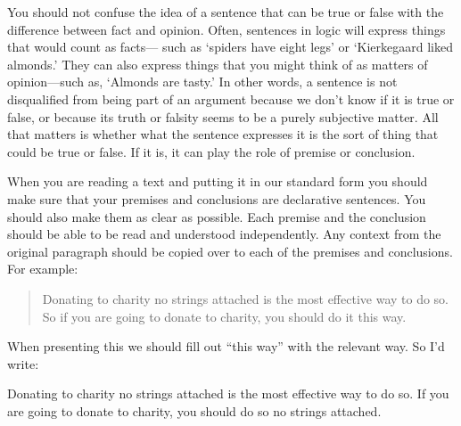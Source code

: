 You should not confuse the idea of a sentence that can be true or false with the difference between fact and opinion. Often, sentences in logic will express things that would count as facts--- such as `spiders have eight legs' or `Kierkegaard liked almonds.' They can also express things that you might think of as matters of opinion---such as, `Almonds are tasty.' In other words, a sentence is not disqualified from being part of an argument because we don't know if it is true or false, or because its truth or falsity seems to be a purely subjective matter. All that matters is whether what the sentence expresses it is the sort of thing that could be true or false. If it is, it can play the role of premise or conclusion.

When you are reading a text and putting it in our standard form you should make sure that your premises and conclusions are declarative sentences.
You should also make them as clear as possible. Each premise and the conclusion should be able to be read and understood independently. Any context from the original paragraph should be copied over to each of the premises and conclusions.
For example:
\begin{quote}
Donating to charity no strings attached is the most effective way to do so. So if you are going to donate to charity, you should do it this way.
\end{quote}
When presenting this we should fill out ``this way'' with the relevant way. So I'd write:
\begin{earg}
\prem	Donating to charity no strings attached is the most effective way to do so.
\conc  If you are going to donate to charity, you should do so no strings attached.
\end{earg}






